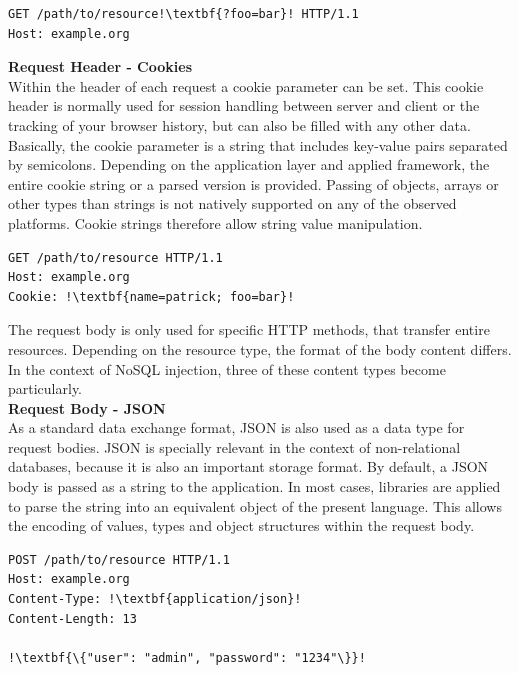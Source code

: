 \begin{lstlisting}[escapechar=!, caption={Example for GET request}, label={lst:http_request_example}]
GET /path/to/resource!\textbf{?foo=bar}! HTTP/1.1
Host: example.org
\end{lstlisting}

\textbf{Request Header - Cookies}\\
Within the header of each request a cookie parameter can be set. This cookie header is normally used for session handling between server and client or the tracking of your browser history, but can also be filled with any other data. Basically, the cookie parameter is a string that includes key-value pairs separated by semicolons. Depending on the application layer and applied framework, the entire cookie string or a parsed version is provided. Passing of objects, arrays or other types than strings is not natively supported on any of the observed platforms. Cookie strings therefore allow string value manipulation. \\

\begin{lstlisting}[escapechar=!, caption={Example for GET request}, label={lst:http_request_example}]
GET /path/to/resource HTTP/1.1
Host: example.org
Cookie: !\textbf{name=patrick; foo=bar}!
\end{lstlisting}

The request body is only used for specific HTTP methods, that transfer entire resources. Depending on the resource type, the format of the body content differs. In the context of NoSQL injection, three of these content types become particularly. \\

\textbf{Request Body - JSON}\\
As a standard data exchange format, JSON is also used as a data type for request bodies. JSON is specially relevant in the context of non-relational databases, because it is also an important storage format. By default, a JSON body is passed as a string to the application. In most cases, libraries are applied to parse the string into an equivalent object of the present language. This allows the encoding of values, types and object structures within the request body. \\

\begin{lstlisting}[escapechar=!, caption={Example for HTTP request}, label={lst:http_request_example}]
POST /path/to/resource HTTP/1.1
Host: example.org
Content-Type: !\textbf{application/json}!
Content-Length: 13

!\textbf{\{"user": "admin", "password": "1234"\}}!
\end{lstlisting}

